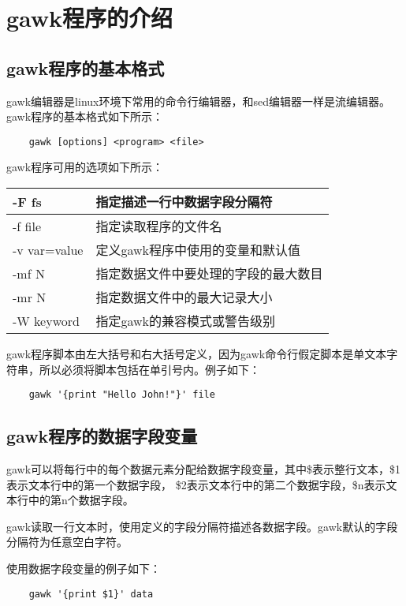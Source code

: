 \documentclass[a4paper,left=2.5cm,right=2.5cm,11pt]{article}
\begin{document}
\tableofcontents

\clearpage

\section{gawk程序的介绍}
\subsection{gawk程序的基本格式}
	gawk编辑器是linux环境下常用的命令行编辑器，和sed编辑器一样是流编辑器。
	gawk程序的基本格式如下所示：
	\begin{lstlisting}
	gawk [options] <program> <file>
	\end{lstlisting}

	gawk程序可用的选项如下所示：
	\begin{longtable}{p{4cm}p{6cm}}
	\hline
	-F fs & 指定描述一行中数据字段分隔符 \\
	\hline
	-f file & 指定读取程序的文件名 \\
	\hline
	-v var=value & 定义gawk程序中使用的变量和默认值 \\
	\hline
	-mf N & 指定数据文件中要处理的字段的最大数目 \\
	\hline
	-mr N & 指定数据文件中的最大记录大小 \\
	\hline
	-W keyword & 指定gawk的兼容模式或警告级别 \\
	\hline
	\end{longtable}

	gawk程序脚本由左大括号和右大括号定义，因为gawk命令行假定脚本是单文本字符串，所以必须将脚本包括在单引号内。例子如下：
	\begin{lstlisting}
	gawk '{print "Hello John!"}' file
	\end{lstlisting}

\subsection{gawk程序的数据字段变量}
	gawk可以将每行中的每个数据元素分配给数据字段变量，其中\$表示整行文本，\$1表示文本行中的第一个数据字段，
	\$2表示文本行中的第二个数据字段，\$n表示文本行中的第n个数据字段。\par
	gawk读取一行文本时，使用定义的字段分隔符描述各数据字段。gawk默认的字段分隔符为任意空白字符。\par
	使用数据字段变量的例子如下：
	\begin{lstlisting}
	gawk '{print $1}' data
	\end{lstlisting}
\end{document}
